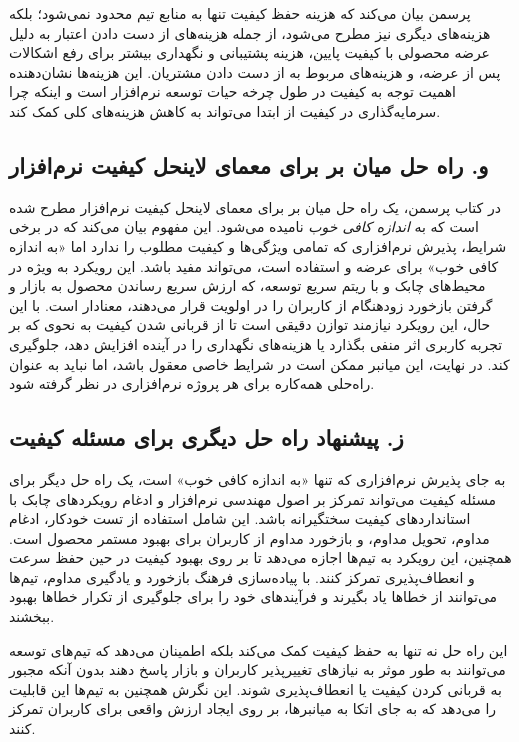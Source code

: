 پرسمن بیان می‌کند که هزینه حفظ کیفیت تنها به منابع تیم محدود نمی‌شود؛ بلکه هزینه‌های دیگری نیز مطرح می‌شود، از جمله هزینه‌های از دست دادن اعتبار به دلیل عرضه محصولی با کیفیت پایین، هزینه پشتیبانی و نگهداری بیشتر برای رفع اشکالات پس از عرضه، و هزینه‌های مربوط به از دست دادن مشتریان. این هزینه‌ها نشان‌دهنده اهمیت توجه به کیفیت در طول چرخه حیات توسعه نرم‌افزار است و اینکه چرا سرمایه‌گذاری در کیفیت از ابتدا می‌تواند به کاهش هزینه‌های کلی کمک کند.

\subsection*{و. راه حل میان بر برای معمای لاینحل کیفیت نرم‌افزار}

در کتاب پرسمن، یک راه حل میان بر برای معمای لاینحل کیفیت نرم‌افزار مطرح شده است که به \textit{اندازه کافی خوب} نامیده می‌شود. این مفهوم بیان می‌کند که در برخی شرایط، پذیرش نرم‌افزاری که تمامی ویژگی‌ها و کیفیت مطلوب را ندارد اما «به اندازه کافی خوب» برای عرضه و استفاده است، می‌تواند مفید باشد. این رویکرد به ویژه در محیط‌های چابک و با ریتم سریع توسعه، که ارزش سریع رساندن محصول به بازار و گرفتن بازخورد زودهنگام از کاربران را در اولویت قرار می‌دهند، معنادار است. با این حال، این رویکرد نیازمند توازن دقیقی است تا از قربانی شدن کیفیت به نحوی که بر تجربه کاربری اثر منفی بگذارد یا هزینه‌های نگهداری را در آینده افزایش دهد، جلوگیری کند. در نهایت، این میانبر ممکن است در شرایط خاصی معقول باشد، اما نباید به عنوان راه‌حلی همه‌کاره برای هر پروژه نرم‌افزاری در نظر گرفته شود.

\subsection*{ز. پیشنهاد راه حل دیگری برای مسئله کیفیت}

به جای پذیرش نرم‌افزاری که تنها «به اندازه کافی خوب» است، یک راه حل دیگر برای مسئله کیفیت می‌تواند تمرکز بر اصول مهندسی نرم‌افزار و ادغام رویکردهای چابک با استانداردهای کیفیت سختگیرانه باشد. این شامل استفاده از تست خودکار، ادغام مداوم، تحویل مداوم، و بازخورد مداوم از کاربران برای بهبود مستمر محصول است. همچنین، این رویکرد به تیم‌ها اجازه می‌دهد تا بر روی بهبود کیفیت در حین حفظ سرعت و انعطاف‌پذیری تمرکز کنند. با پیاده‌سازی فرهنگ بازخورد و یادگیری مداوم، تیم‌ها می‌توانند از خطاها یاد بگیرند و فرآیندهای خود را برای جلوگیری از تکرار خطاها بهبود ببخشند.

این راه حل نه تنها به حفظ کیفیت کمک می‌کند بلکه اطمینان می‌دهد که تیم‌های توسعه می‌توانند به طور موثر به نیازهای تغییرپذیر کاربران و بازار پاسخ دهند بدون آنکه مجبور به قربانی کردن کیفیت یا انعطاف‌پذیری شوند. این نگرش همچنین به تیم‌ها این قابلیت را می‌دهد که به جای اتکا به میانبرها، بر روی ایجاد ارزش واقعی برای کاربران تمرکز کنند.